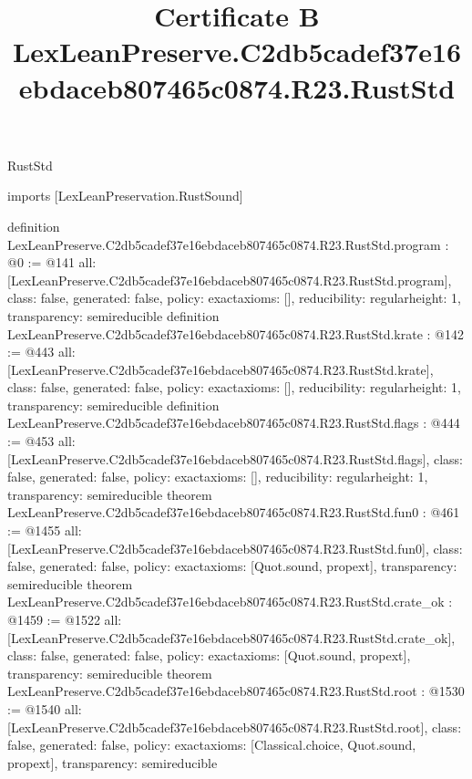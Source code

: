 \begin{lexlean}{RustStd}
\title{Certificate B LexLeanPreserve.C2db5cadef37e16ebdaceb807465c0874.R23.RustStd}
\begin{coremodule}
imports [LexLeanPreservation.RustSound]

definition LexLeanPreserve.C2db5cadef37e16ebdaceb807465c0874.R23.RustStd.program : @0 := @141 {
  all: [LexLeanPreserve.C2db5cadef37e16ebdaceb807465c0874.R23.RustStd.program],
  class: false,
  generated: false,
  policy: exact{axioms: []},
  reducibility: regular{height: 1},
  transparency: semireducible
}
definition LexLeanPreserve.C2db5cadef37e16ebdaceb807465c0874.R23.RustStd.krate : @142 := @443 {
  all: [LexLeanPreserve.C2db5cadef37e16ebdaceb807465c0874.R23.RustStd.krate],
  class: false,
  generated: false,
  policy: exact{axioms: []},
  reducibility: regular{height: 1},
  transparency: semireducible
}
definition LexLeanPreserve.C2db5cadef37e16ebdaceb807465c0874.R23.RustStd.flags : @444 := @453 {
  all: [LexLeanPreserve.C2db5cadef37e16ebdaceb807465c0874.R23.RustStd.flags],
  class: false,
  generated: false,
  policy: exact{axioms: []},
  reducibility: regular{height: 1},
  transparency: semireducible
}
theorem LexLeanPreserve.C2db5cadef37e16ebdaceb807465c0874.R23.RustStd.fun0 : @461 := @1455 {
  all: [LexLeanPreserve.C2db5cadef37e16ebdaceb807465c0874.R23.RustStd.fun0],
  class: false,
  generated: false,
  policy: exact{axioms: [Quot.sound, propext]},
  transparency: semireducible
}
theorem LexLeanPreserve.C2db5cadef37e16ebdaceb807465c0874.R23.RustStd.crate_ok : @1459 := @1522 {
  all: [LexLeanPreserve.C2db5cadef37e16ebdaceb807465c0874.R23.RustStd.crate_ok],
  class: false,
  generated: false,
  policy: exact{axioms: [Quot.sound, propext]},
  transparency: semireducible
}
theorem LexLeanPreserve.C2db5cadef37e16ebdaceb807465c0874.R23.RustStd.root : @1530 := @1540 {
  all: [LexLeanPreserve.C2db5cadef37e16ebdaceb807465c0874.R23.RustStd.root],
  class: false,
  generated: false,
  policy: exact{axioms: [Classical.choice, Quot.sound, propext]},
  transparency: semireducible
}


\end{coremodule}
\end{lexlean}
